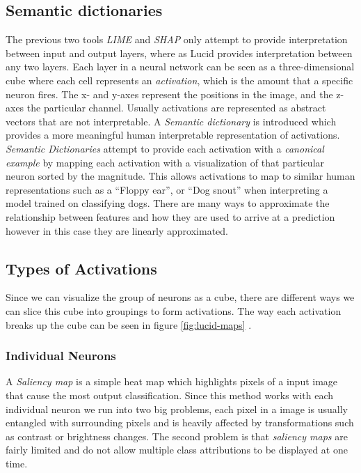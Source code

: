 \subsection{Semantic dictionaries}
The previous two tools \emph{LIME} and \emph{SHAP} only attempt to provide interpretation  between input and output layers, where as Lucid provides interpretation between any two layers. Each layer in a neural network can be seen as a three-dimensional cube where each cell represents an \emph{activation}, which is the amount that a specific neuron fires. The x- and y-axes represent the positions in the image, and the z-axes the particular channel. Usually activations are represented as abstract vectors that are not interpretable. A \emph{Semantic dictionary} is introduced which provides a more meaningful human interpretable representation of activations. \emph{Semantic Dictionaries} attempt to provide each activation with a \emph{canonical example} by mapping each activation with a visualization of that particular neuron sorted by the magnitude. This allows activations to map to similar human representations such as a ``Floppy ear'', or ``Dog snout'' when interpreting a model trained on classifying dogs. There are many ways to approximate the relationship between features and how they are used to arrive at a prediction however in this case they are linearly approximated.

\subsection{Types of Activations} \label{sect:lucid-activations} 
Since we can visualize the group of neurons as a cube, there are different ways we can slice this cube into groupings to form activations. The way each activation breaks up the cube can be seen in figure \ref{fig:lucid-maps}
.
\subsubsection{Individual Neurons}
A \emph{Saliency map} \cite{10.1023/A:1012460413855} is a simple heat map which highlights pixels of a input image that cause the most output classification. Since this method works with each individual neuron we run into two big problems, each pixel in a image is usually entangled with surrounding pixels and is heavily affected by transformations such as contrast or brightness changes. The second problem is that \emph{saliency maps} are fairly limited and do not allow multiple class attributions to be displayed at one time.

